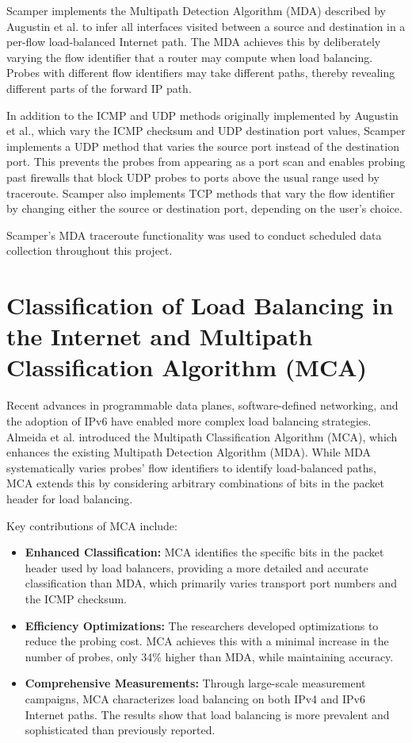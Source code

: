 \documentclass[12pt]{cwru_thesis}
\begin{document}
Scamper implements the Multipath Detection Algorithm (MDA) described by Augustin et al. to infer all interfaces visited between a source and destination in a per-flow load-balanced Internet path. The MDA achieves this by deliberately varying the flow identifier that a router may compute when load balancing. Probes with different flow identifiers may take different paths, thereby revealing different parts of the forward IP path.

In addition to the ICMP and UDP methods originally implemented by Augustin et al., which vary the ICMP checksum and UDP destination port values, Scamper implements a UDP method that varies the source port instead of the destination port. This prevents the probes from appearing as a port scan and enables probing past firewalls that block UDP probes to ports above the usual range used by traceroute. Scamper also implements TCP methods that vary the flow identifier by changing either the source or destination port, depending on the user’s choice.

Scamper's MDA traceroute functionality was used to conduct scheduled data collection throughout this project.


\section{Classification of Load Balancing in the Internet and Multipath Classification Algorithm (MCA)}

Recent advances in programmable data planes, software-defined networking, and the adoption of IPv6 have enabled more complex load balancing strategies. Almeida et al. introduced the Multipath Classification Algorithm (MCA), which enhances the existing Multipath Detection Algorithm (MDA). While MDA systematically varies probes' flow identifiers to identify load-balanced paths, MCA extends this by considering arbitrary combinations of bits in the packet header for load balancing.

Key contributions of MCA include:
\begin{itemize}
    \item \textbf{Enhanced Classification:} MCA identifies the specific bits in the packet header used by load balancers, providing a more detailed and accurate classification than MDA, which primarily varies transport port numbers and the ICMP checksum.
    \item \textbf{Efficiency Optimizations:} The researchers developed optimizations to reduce the probing cost. MCA achieves this with a minimal increase in the number of probes, only 34\% higher than MDA, while maintaining accuracy.
    \item \textbf{Comprehensive Measurements:} Through large-scale measurement campaigns, MCA characterizes load balancing on both IPv4 and IPv6 Internet paths. The results show that load balancing is more prevalent and sophisticated than previously reported.
\end{itemize}
\end{document}
